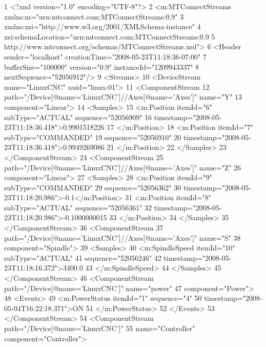  1 <?xml version="1.0" encoding="UTF-8"?>
 2 <m:MTConnectStreams xmlns:m="urn:mtconnect.com:MTConnectStreams:0.9"
 3                  xmlns:xsi="http://www.w3.org/2001/XMLSchema-instance"
 4                  xsi:schemaLocation="urn:mtconnect.com:MTConnectStreams:0.9
 5                  http://www.mtconnect.org/schemas/MTConnectStreams.xsd"> 
 6   <Header sender="localhost" creationTime="2008-05-23T11:18:36-07:00"
 7           bufferSize="100000" version="0.9" instanceId="1209943337"
 8           nextSequence="52056912"/>
 9   <Streams>
10     <DeviceStream name="LinuxCNC" uuid="linux-01">
11       <ComponentStream
12          path="/Device[@name='LinuxCNC']//Axes[@name='Axes']" name="Y"
13          component="Linear"> 
14         <Samples>
15           <m:Position itemId="6" subType="ACTUAL" sequence="52056909"
16                       timestamp="2008-05-23T11:18:36.418">0.9901518226
17           </m:Position> 
18           <m:Position itemId="7" subType="COMMANDED"
19                       sequence="52056910"
20                       timestamp="2008-05-23T11:18:36.418">0.9949269086
21           </m:Position>
22         </Samples>
23       </ComponentStream>
24       <ComponentStream
25          path="/Device[@name='LinuxCNC']//Axes[@name='Axes']" name="Z"
26          component="Linear"> 
27         <Samples>
28           <m:Position itemId="9" subType="COMMANDED"
29                       sequence="52056362"
30                       timestamp="2008-05-23T11:18:20.986">-0.1</m:Position>
31           <m:Position itemId="8" subType="ACTUAL" sequence="52056361"
32                       timestamp="2008-05-23T11:18:20.986">-0.1000000015
33           </m:Position>
34         </Samples>
35       </ComponentStream>
36       <ComponentStream
37          path="/Device[@name='LinuxCNC']//Axes[@name='Axes']" name="S"
38          component="Spindle"> 
39         <Samples>
40           <m:SpindleSpeed itemId="10" subType="ACTUAL"
41                           sequence="52056246"
42                           timestamp="2008-05-23T11:18:16.372">3400.0
43           </m:SpindleSpeed>
44         </Samples>
45       </ComponentStream>
46       <ComponentStream path="/Device[@name='LinuxCNC']" name="power"
47                        component="Power"> 
48         <Events>
49           <m:PowerStatus itemId="1" sequence="4"
50                          timestamp="2008-05-04T16:22:18.371">ON
51           </m:PowerStatus>
52         </Events>
53       </ComponentStream>
54       <ComponentStream path="/Device[@name='LinuxCNC']"
55                        name="Controller" component="Controller"> 
